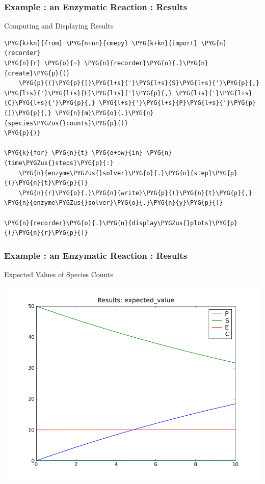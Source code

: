\documentclass[hyperref={colorlinks=true}]{beamer}
\begin{document}
\begin{frame}[fragile]
\frametitle{Example : an Enzymatic Reaction : Results}
\begin{block}{Computing and Displaying Results}
\begin{Verbatim}[commandchars=\\\{\}]
\PYG{k+kn}{from} \PYG{n+nn}{cmepy} \PYG{k+kn}{import} \PYG{n}{recorder}
\PYG{n}{r} \PYG{o}{=} \PYG{n}{recorder}\PYG{o}{.}\PYG{n}{create}\PYG{p}{(}
    \PYG{p}{(}\PYG{p}{[}\PYG{l+s}{'}\PYG{l+s}{S}\PYG{l+s}{'}\PYG{p}{,} \PYG{l+s}{'}\PYG{l+s}{E}\PYG{l+s}{'}\PYG{p}{,} \PYG{l+s}{'}\PYG{l+s}{C}\PYG{l+s}{'}\PYG{p}{,} \PYG{l+s}{'}\PYG{l+s}{P}\PYG{l+s}{'}\PYG{p}{]}\PYG{p}{,} \PYG{n}{m}\PYG{o}{.}\PYG{n}{species\PYGZus{}counts}\PYG{p}{)}
\PYG{p}{)}

\PYG{k}{for} \PYG{n}{t} \PYG{o+ow}{in} \PYG{n}{time\PYGZus{}steps}\PYG{p}{:}
    \PYG{n}{enzyme\PYGZus{}solver}\PYG{o}{.}\PYG{n}{step}\PYG{p}{(}\PYG{n}{t}\PYG{p}{)}
    \PYG{n}{r}\PYG{o}{.}\PYG{n}{write}\PYG{p}{(}\PYG{n}{t}\PYG{p}{,} \PYG{n}{enzyme\PYGZus{}solver}\PYG{o}{.}\PYG{n}{y}\PYG{p}{)}

\PYG{n}{recorder}\PYG{o}{.}\PYG{n}{display\PYGZus{}plots}\PYG{p}{(}\PYG{n}{r}\PYG{p}{)}
\end{Verbatim}
\end{block}
\end{frame}

\begin{frame}
\frametitle{Example : an Enzymatic Reaction : Results}
\begin{block}{Expected Values of Species Counts}
\begin{center}
\includegraphics[height=0.75\textheight]{results_ev.png}
\end{center}
\end{block}

\end{frame}
\end{document}
